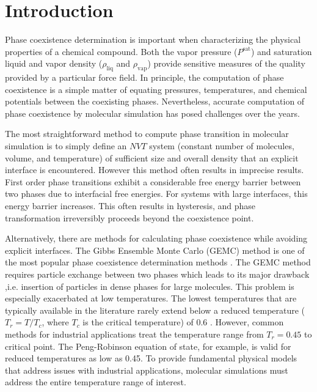 \documentclass[5p,times]{elsarticle}
\begin{document}

\section{Introduction} \label{sec:introduction}
Phase coexistence determination is important when characterizing the physical properties of a chemical compound. Both the vapor pressure ($P^{\mathrm{sat}}$) and saturation liquid and vapor density ($\rho_{\mathrm{liq}}$ and $\rho_{\mathrm{vap}}$) provide sensitive measures of the quality provided by a particular force field. In principle, the computation of phase coexistence is a simple matter of equating pressures, temperatures, and chemical potentials between the coexisting phases. Nevertheless, accurate computation of phase coexistence by molecular simulation has posed challenges over the years. 

The most straightforward method to compute phase transition in molecular simulation is to simply define an $NVT$ system (constant number of molecules, volume, and temperature) of sufficient size and overall density that an explicit interface is encountered. However this method often results in imprecise results. First order phase transitions exhibit a considerable free energy barrier between two phases due to interfacial free energies. For systems with large interfaces, this energy barrier increases. This often results in hysteresis, and phase transformation irreversibly proceeds beyond the coexistence point. \cite{Frenkel1996} 

Alternatively, there are methods for calculating phase coexistence while avoiding explicit interfaces. The Gibbs Ensemble Monte Carlo (GEMC) method \cite{Panagiotopoulos1987} is one of the most popular phase coexistence determination methods \cite{Paluch2008}.  The GEMC method requires particle exchange between two phases which leads to its major drawback ,i.e. insertion of particles in dense phases for large molecules. This problem is especially exacerbated  at low temperatures. The lowest temperatures that are typically available in the literature rarely extend below a reduced temperature ($T_r = T/T_c$, where $T_c$ is the critical temperature) of 0.6 \cite{Martin1998,Potoff2009}. However, common methods for industrial applications treat the temperature range from $T_r=0.45$ to critical point. The Peng-Robinson equation of state, for example, is valid for reduced temperatures as low as 0.45. \cite{Peng1976} To provide fundamental physical models that address issues with industrial applications, molecular simulations must address the entire temperature range of interest. 
\end{document}
